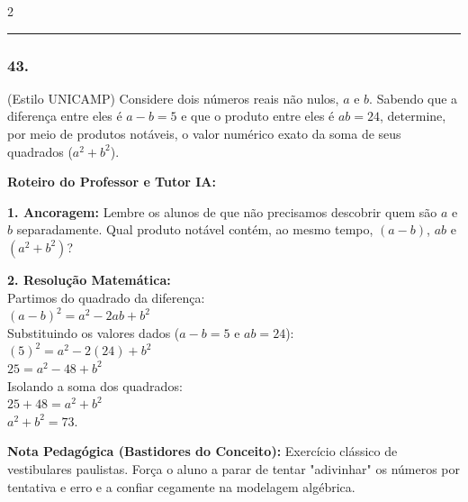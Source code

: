 \begin{multicols*}{2}
\par\vspace{\espacoQuestao}


\noindent\textcolor{CorLinha}{\rule{\linewidth}{0.5pt}} 
\par\vspace{\espacoPreQuestao}
\subsubsection*{43.} 
\begin{enunciadoLiteral}
(Estilo UNICAMP) Considere dois números reais não nulos, $a$ e $b$. Sabendo que a diferença entre eles é $a - b = 5$ e que o produto entre eles é $ab = 24$, determine, por meio de produtos notáveis, o valor numérico exato da soma de seus quadrados ($a^2 + b^2$).
\end{enunciadoLiteral}

\ifgabarito
    \begin{tcolorbox}[colback=CorTitUm!5, colframe=CorTitUm, boxrule=1pt, arc=4pt, left=6pt, right=6pt, top=6pt, bottom=6pt]
    \small\textbf{\textcolor{CorTitUm}{Roteiro do Professor e Tutor IA:}}\par\vspace{0.1cm}
    \color{CinzaEscuro}
    \textbf{1. Ancoragem:} Lembre os alunos de que não precisamos descobrir quem são $a$ e $b$ separadamente. Qual produto notável contém, ao mesmo tempo, $(a-b)$, $ab$ e $(a^2+b^2)$?\par\vspace{0.1cm}
    \textbf{2. Resolução Matemática:}\\
    Partimos do quadrado da diferença:\\
    $(a - b)^2 = a^2 - 2ab + b^2$\\
    Substituindo os valores dados ($a - b = 5$ e $ab = 24$):\\
    $(5)^2 = a^2 - 2(24) + b^2$\\
    $25 = a^2 - 48 + b^2$\\
    Isolando a soma dos quadrados:\\
    $25 + 48 = a^2 + b^2$\\
    $a^2 + b^2 = 73$.
    \end{tcolorbox}
    \vspace{0.15cm}
    
    \begin{boxexplicacao}
    \textbf{Nota Pedagógica (Bastidores do Conceito):} Exercício clássico de vestibulares paulistas. Força o aluno a parar de tentar "adivinhar" os números por tentativa e erro e a confiar cegamente na modelagem algébrica.
    \end{boxexplicacao}
\fi


\end{multicols*}

